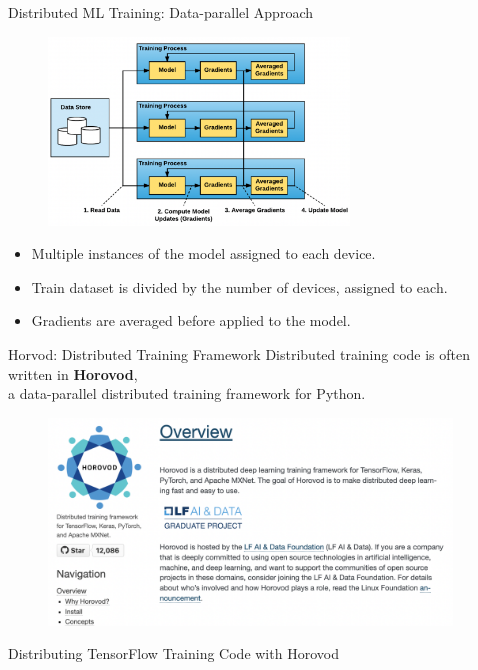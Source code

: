 \documentclass{beamer}
\begin{document}
\begin{frame}{Distributed ML Training: Data-parallel Approach}
  \begin{figure}
    \includegraphics[height=50mm]{data-parallel}
  \end{figure}
  {\footnotesize
  \begin{itemize}
    \item Multiple instances of the model assigned to each device.
    \item Train dataset is divided by the number of devices, assigned to each.
    \item Gradients are averaged before applied to the model.
  \end{itemize} 
  }
\end{frame}

\begin{frame}[fragile]{Horvod: Distributed Training Framework}
  Distributed training code is often written in \textbf{Horovod},\\
  a data-parallel distributed training framework for Python. 
  \begin{figure}[!h]
    \includegraphics[height=55mm]{horovod_logo}
  \end{figure}
\end{frame}


\begin{frame}{Distributing TensorFlow Training Code with Horovod}
  {\tiny
  \inputminted{Python}{horovod_ex.py}
  }
\end{frame}
\end{document}
